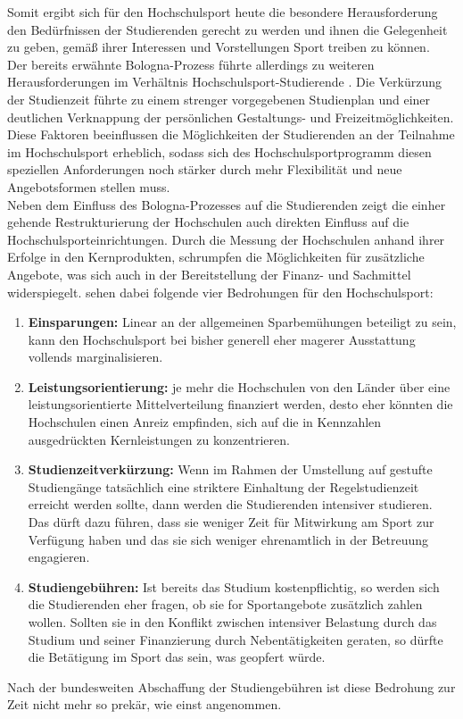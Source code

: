 Somit ergibt sich für den Hochschulsport heute die besondere Herausforderung den Bedürfnissen der Studierenden gerecht zu werden und ihnen die Gelegenheit zu geben, gemäß ihrer Interessen und Vorstellungen Sport treiben zu können. \\
Der bereits erwähnte Bologna-Prozess führte allerdings zu weiteren Herausforderungen im Verhältnis Hochschulsport-Studierende \cite[vgl. ][S.7]{Berthold.2007}. Die Verkürzung der Studienzeit führte zu einem strenger vorgegebenen Studienplan und einer deutlichen Verknappung der persönlichen Gestaltungs- und Freizeitmöglichkeiten. Diese Faktoren beeinflussen die Möglichkeiten der Studierenden an der Teilnahme im Hochschulsport erheblich, sodass sich des Hochschulsportprogramm diesen speziellen Anforderungen noch stärker durch mehr Flexibilität und neue Angebotsformen stellen muss.
\\
Neben dem Einfluss des Bologna-Prozesses auf die Studierenden zeigt die einher gehende Restrukturierung der Hochschulen auch direkten Einfluss auf die Hochschulsporteinrichtungen. Durch die Messung der Hochschulen anhand ihrer Erfolge in den Kernprodukten, schrumpfen die Möglichkeiten für zusätzliche Angebote, was sich auch in der Bereitstellung der Finanz- und Sachmittel widerspiegelt. \citeauthor{Berthold.2007} sehen dabei folgende vier Bedrohungen für den Hochschulsport:
\begin{enumerate}
\item \textbf{Einsparungen:} Linear an der allgemeinen Sparbemühungen beteiligt zu sein, kann den Hochschulsport bei bisher generell eher magerer Ausstattung vollends marginalisieren.
\item \textbf{Leistungsorientierung:} je mehr die Hochschulen von den Länder über eine leistungsorientierte Mittelverteilung finanziert werden, desto eher könnten die Hochschulen einen Anreiz empfinden, sich auf die in Kennzahlen ausgedrückten Kernleistungen zu konzentrieren.
\item \textbf{Studienzeitverkürzung:} Wenn im Rahmen der Umstellung auf gestufte Studiengänge tatsächlich eine striktere Einhaltung der Regelstudienzeit erreicht werden sollte, dann werden die Studierenden intensiver studieren. Das dürft dazu führen, dass sie weniger Zeit für Mitwirkung am Sport zur Verfügung haben und das sie sich weniger ehrenamtlich in der Betreuung engagieren.
\item \textbf{Studiengebühren:} Ist bereits das Studium kostenpflichtig, so werden sich die Studierenden eher fragen, ob sie for Sportangebote zusätzlich zahlen wollen. Sollten sie in den Konflikt zwischen intensiver Belastung durch das Studium und seiner Finanzierung durch Nebentätigkeiten geraten, so dürfte die Betätigung im Sport das sein, was geopfert würde.
\end{enumerate}
\cite[siehe ][S.16]{Berthold.2007}
Nach der bundesweiten Abschaffung der Studiengebühren ist diese Bedrohung zur Zeit nicht mehr so prekär, wie einst angenommen.
\\

